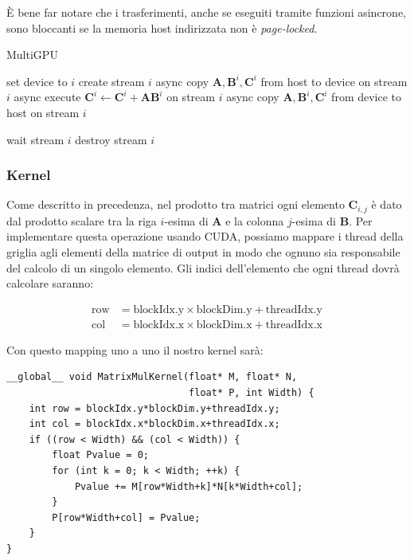 \documentclass[a4paper]{article}
\begin{document}
È bene far notare che i trasferimenti, anche se eseguiti tramite funzioni asincrone, sono bloccanti se la memoria host indirizzata non è \textit{page-locked}\cite{nvidiaCUDAProgramming}.

\begin{algorithm}[H]
    \caption{MultiGPU}
    \begin{algorithmic}
        \State set device to $i$
        \State create stream $i$
        \State async copy $\mathbf{A}, \mathbf{B}^i, \mathbf{C}^i$ from host to device on stream $i$
        \State async execute $\mathbf{C}^{i} \gets \mathbf{C}^{i} + \mathbf{A}\mathbf{B}^{i}$ on stream $i$
        \State async copy $\mathbf{A}, \mathbf{B}^i, \mathbf{C}^i$ from device to host on stream $i$
        \EndFor

        \State wait stream $i$
        \State destroy stream $i$
        \EndFor
    \end{algorithmic}
\end{algorithm}

\subsubsection{Kernel}

Come descritto in precedenza, nel prodotto tra matrici ogni elemento $\mathbf{C}_{i,j}$ è dato dal prodotto scalare tra la riga $i$-esima di $\mathbf{A}$ e la colonna $j$-esima di $\mathbf{B}$. Per implementare questa operazione usando CUDA, possiamo mappare i thread della griglia agli elementi della matrice di output in modo che ognuno sia responsabile del calcolo di un singolo elemento. Gli indici dell'elemento che ogni thread dovrà calcolare saranno:

\[
    \begin{aligned}
        \text{row} & = \text{blockIdx.y} \times \text{blockDim.y} + \text{threadIdx.y} \\
        \text{col} & = \text{blockIdx.x} \times \text{blockDim.x} + \text{threadIdx.x}
    \end{aligned}
\]

Con questo mapping uno a uno il nostro kernel sarà:

\begin{lstlisting}[caption={Kernel CUDA con memoria globale}, label={lst:1}]
__global__ void MatrixMulKernel(float* M, float* N,
                                float* P, int Width) {
    int row = blockIdx.y*blockDim.y+threadIdx.y;
    int col = blockIdx.x*blockDim.x+threadIdx.x;
    if ((row < Width) && (col < Width)) {
        float Pvalue = 0;
        for (int k = 0; k < Width; ++k) {
            Pvalue += M[row*Width+k]*N[k*Width+col];
        }
        P[row*Width+col] = Pvalue;
    }
}
\end{lstlisting}
\end{document}
